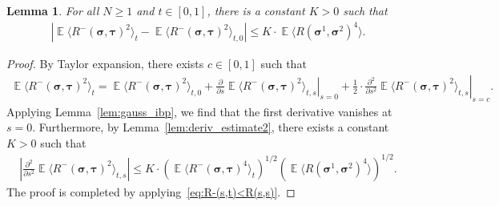 \documentclass[letterpaper,11pt,reqno]{amsart}
\newtheorem{lem}[thm]{Lemma}
\renewcommand{\leq}{\leqslant}
\renewcommand{\geq}{\geqslant}
\newcommand{\ra}{\rangle}
\newcommand{\la}{\langle}
\newcommand{\abs}[1]{\left\vert#1\right\vert}
\newcommand{\mvgs}{\boldsymbol{\sigma}}\newcommand{\mvgS}{\boldsymbol{\Sigma}}\newcommand{\mvgt}{\boldsymbol{\tau}}
\DeclareMathOperator{\E}{\mathds{E}}
\begin{document}
\begin{lem}\label{lem:1st_deriv}
    For all \(N \geq 1\) and \(t \in [0,1]\), there is a constant \(K>0\) such that
    \begin{align*}
        \abs{\E \la R^-(\mvgs, \mvgt)^2\ra_t - \E \la R^-(\mvgs, \mvgt)^2\ra_{t,0}} \leq K\cdot
        \E \la R(\mvgs^1, \mvgs^2)^4\ra.
            \end{align*}
\end{lem}
\begin{proof}
    By Taylor expansion, there exists \(c \in [0,1]\) such that
    \begin{align*}
        \E \la R^-(\mvgs, \mvgt)^2\ra_t 
        = \E \la R^-(\mvgs, \mvgt)^2\ra_{t,0}
        + \left. \frac{\partial}{\partial s} \E \la R^-(\mvgs, \mvgt)^2\ra_{t,s} \right|_{s=0} + \frac{1}{2} \cdot \left. \frac{\partial^2}{\partial s^2} \E \la R^-(\mvgs, \mvgt)^2\ra_{t,s} \right|_{s=c}.
    \end{align*}
    Applying Lemma~\ref{lem:gauss_ibp}, we find that the first derivative vanishes at \(s=0\). Furthermore, by Lemma~\ref{lem:deriv_estimate2}, there exists a constant \(K > 0\) such that
    \begin{align*}
        \abs{ \frac{\partial^2}{\partial s^2} \E \la R^-(\mvgs, \mvgt)^2\ra_{t,s} }
        \leq K\cdot \left( \E \la R^-(\mvgs, \mvgt)^4\ra_{t} \right)^{1/2}
        \left( \E \la R(\mvgs^1, \mvgs^2)^4\ra \right)^{1/2}.
    \end{align*}
    The proof is completed by applying~\eqref{eq:R-(s,t)<R(s,s)}.
\end{proof}
\end{document}

